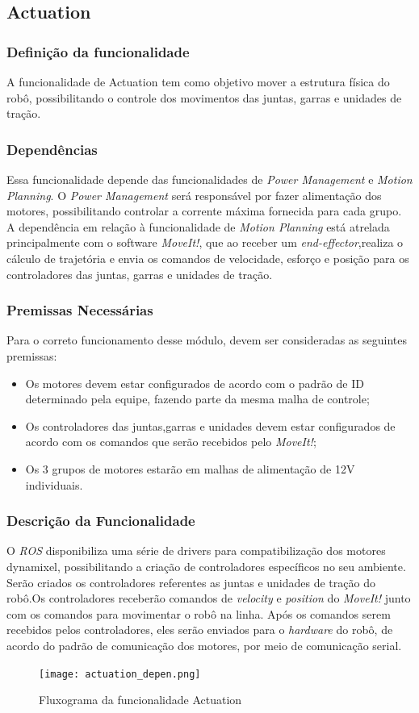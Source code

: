 \subsection{Actuation }
\label{ssec:actu}
\subsubsection{Definição da funcionalidade}
A funcionalidade de Actuation tem como objetivo mover a estrutura física do robô, possibilitando o controle dos movimentos das juntas, garras e unidades de tração.
\subsubsection{Dependências}
Essa funcionalidade depende das funcionalidades de \textit{Power Management} e \textit{Motion Planning}. O \textit{Power Management} será responsável por fazer alimentação dos motores, possibilitando controlar a corrente máxima fornecida para cada grupo.
A dependência em relação à funcionalidade de \textit{Motion Planning} está atrelada principalmente com o software \textit{MoveIt!}, que ao receber um \textit{end-effector},realiza o cálculo de trajetória e envia os comandos de velocidade, esforço e posição para os controladores das juntas, garras e unidades de tração.

\subsubsection{Premissas Necessárias}
Para o correto funcionamento desse módulo, devem ser consideradas as seguintes premissas:
\begin{itemize}
	\item Os motores devem estar configurados de acordo com o padrão de ID determinado pela equipe, fazendo parte da mesma malha de controle;
	\item Os controladores das juntas,garras e unidades devem estar configurados de acordo com os comandos que serão recebidos pelo\textit{ MoveIt!};
	\item Os 3 grupos de motores estarão em malhas de alimentação de 12V individuais.
\end{itemize}
\subsubsection{Descrição da Funcionalidade}
O \textit{ROS} disponibiliza uma série de drivers para compatibilização dos motores dynamixel, possibilitando a criação de controladores específicos no seu ambiente. Serão criados os controladores referentes as juntas e unidades de tração do robô.Os controladores receberão comandos de \textit{velocity} e \textit{position} do \textit{MoveIt!} junto com os comandos para movimentar o robô na linha.
Após os comandos serem recebidos pelos controladores, eles serão enviados para o \textit{hardware} do robô, de acordo do padrão de comunicação dos motores, por meio de comunicação serial. 
\begin{figure}[h]
	\centering
	\texttt{[image: actuation\_depen.png]}
	\caption{Fluxograma da funcionalidade Actuation}
	\label{fig:depen_actuation}
\end{figure}

